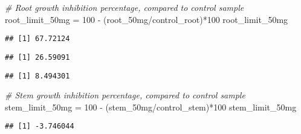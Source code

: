 \documentclass[
]{article}
\newenvironment{Shaded}{\begin{snugshade}}{\end{snugshade}}
\newcommand{\CommentTok}[1]{\textcolor[rgb]{0.56,0.35,0.01}{\textit{#1}}}
\newcommand{\DecValTok}[1]{\textcolor[rgb]{0.00,0.00,0.81}{#1}}
\newcommand{\FunctionTok}[1]{\textcolor[rgb]{0.00,0.00,0.00}{#1}}
\newcommand{\NormalTok}[1]{#1}
\newcommand{\OtherTok}[1]{\textcolor[rgb]{0.56,0.35,0.01}{#1}}
\newcommand{\SpecialCharTok}[1]{\textcolor[rgb]{0.00,0.00,0.00}{#1}}
\begin{document}
\begin{Shaded}
\begin{Highlighting}[]
\CommentTok{\# Root growth inhibition percentage, compared to control sample}
\NormalTok{root\_limit\_50mg }\OtherTok{=} \DecValTok{100} \SpecialCharTok{{-}}\NormalTok{ (root\_50mg}\SpecialCharTok{/}\NormalTok{control\_root)}\SpecialCharTok{*}\DecValTok{100}
\NormalTok{root\_limit\_50mg}
\end{Highlighting}
\end{Shaded}

\begin{verbatim}
## [1] 67.72124
\end{verbatim}

\begin{Shaded}
\end{Shaded}

\begin{verbatim}
## [1] 26.59091
\end{verbatim}

\begin{Shaded}
\end{Shaded}

\begin{verbatim}
## [1] 8.494301
\end{verbatim}

\begin{Shaded}
\begin{Highlighting}[]
\CommentTok{\# Stem growth inhibition percentage, compared to control sample}
\NormalTok{stem\_limit\_50mg }\OtherTok{=} \DecValTok{100} \SpecialCharTok{{-}}\NormalTok{ (stem\_50mg}\SpecialCharTok{/}\NormalTok{control\_stem)}\SpecialCharTok{*}\DecValTok{100}
\NormalTok{stem\_limit\_50mg}
\end{Highlighting}
\end{Shaded}

\begin{verbatim}
## [1] -3.746044
\end{verbatim}
\end{document}
